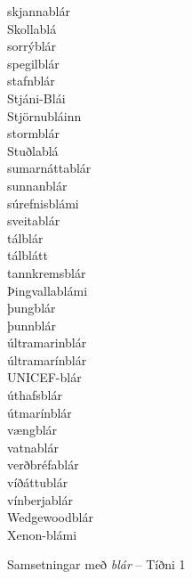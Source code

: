 \documentclass[../samsetningasafn.tex]{subfiles}
\begin{document}
\begin{bigwordlist}
\begin{footnotesize}
\begin{multicols}{4}
\begin{description}
		\item [skjannablár]
		\item [Skollablá]
		\item [sorrýblár]
		\item [spegilblár]
		\item [stafnblár]
		\item [Stjáni-Blái]
		\item [Stjörnubláinn]
		\item [stormblár]
		\item [Stuðlablá]
		\item [sumarnáttablár]
		\item [sunnanblár]
		\item [súrefnisblámi]
		\item [sveitablár]
		\item [tálblár]
		\item [tálblátt]
		\item [tannkremsblár]
		\item [Þingvallablámi]
		\item [þungblár]
		\item [þunnblár]
		\item [últramarinblár]
		\item [últramarínblár]
		\item [UNICEF-blár]
		\item [úthafsblár]
		\item [útmarínblár]
		\item [vængblár]
		\item [vatnablár]
		\item [verðbréfablár]
		\item [víðáttublár]
		\item [vínberjablár]
		\item [Wedgewoodblár]
		\item [Xenon-blámi]

	\end{description}
\end{multicols}
\end{footnotesize}

\label{listi:blar1}
\caption{Samsetningar með \textit{blár} -- Tíðni 1}
\end{bigwordlist}
\end{document}
